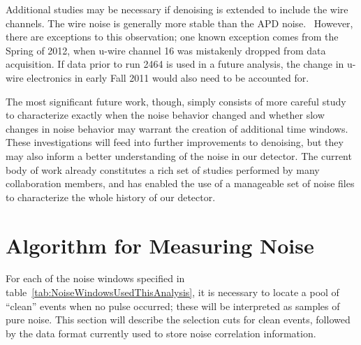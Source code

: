 Additional studies may be necessary if denoising is extended to include the wire channels.  The wire noise is generally more stable than the APD noise.~\cite{JosiahCoherentAPDNoise}  However, there are exceptions to this observation; one known exception comes from the Spring of 2012, when u-wire channel 16 was mistakenly dropped from data acquisition.  If data prior to run 2464 is used in a future analysis, the change in u-wire electronics in early Fall 2011 would also need to be accounted for.

The most significant future work, though, simply consists of more careful study to characterize exactly when the noise behavior changed and whether slow changes in noise behavior may warrant the creation of additional time windows.  These investigations will feed into further improvements to denoising, but they may also inform a better understanding of the noise in our detector.  The current body of work already constitutes a rich set of studies performed by many collaboration members, and has enabled the use of a manageable set of noise files to characterize the whole history of our detector.

\section{Algorithm for Measuring Noise}\label{sec:NoiseCorrelationsImplementation}

For each of the noise windows specified in table~\ref{tab:NoiseWindowsUsedThisAnalysis}, it is necessary to locate a pool of ``clean'' events when no pulse occurred; these will be interpreted as samples of pure noise.  This section will describe the selection cuts for clean events, followed by the data format currently used to store noise correlation information.

